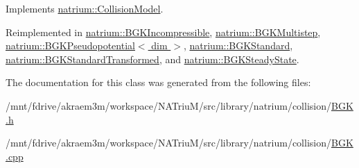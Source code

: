 Implements \hyperlink{classnatrium_1_1CollisionModel}{natrium::CollisionModel}.

Reimplemented in \hyperlink{classnatrium_1_1BGKIncompressible_a53dc53b5ddb31a6ef67acd25abb405f1}{natrium::BGKIncompressible}, \hyperlink{classnatrium_1_1BGKMultistep_a503d69a669d91979a885d1b02c2edb0a}{natrium::BGKMultistep}, \hyperlink{classnatrium_1_1BGKPseudopotential_afa18cdab45c73c33b2660f37d0ca82ba}{natrium::BGKPseudopotential$<$ dim $>$}, \hyperlink{classnatrium_1_1BGKStandard_a8e0493b063d56275d7ee607e25c4145e}{natrium::BGKStandard}, \hyperlink{classnatrium_1_1BGKStandardTransformed_aaa2e752c6aa2294f1ebeb9d326ba9eb8}{natrium::BGKStandardTransformed}, and \hyperlink{classnatrium_1_1BGKSteadyState_a8554fb624c5a3abe01651747b3d9aeb7}{natrium::BGKSteadyState}.

The documentation for this class was generated from the following files:\begin{DoxyCompactItemize}
\item 
/mnt/fdrive/akraem3m/workspace/NATriuM/src/library/natrium/collision/\hyperlink{BGK_8h}{BGK.h}\item 
/mnt/fdrive/akraem3m/workspace/NATriuM/src/library/natrium/collision/\hyperlink{BGK_8cpp}{BGK.cpp}\end{DoxyCompactItemize}
